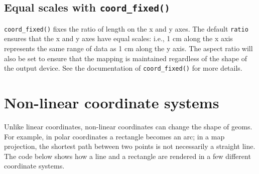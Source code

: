 \subsection{\texorpdfstring{Equal scales with
\texttt{coord\_fixed()}}{Equal scales with coord\_fixed()}}\label{equal-scales-with-coordux5ffixed}

\texttt{coord\_fixed()} fixes the ratio of length on the x and y axes.
The default \texttt{ratio} ensures that the x and y axes have equal
scales: i.e., 1 cm along the x axis represents the same range of data as
1 cm along the y axis. The aspect ratio will also be set to ensure that
the mapping is maintained regardless of the shape of the output device.
See the documentation of \texttt{coord\_fixed()} for more details.
 

\section{Non-linear coordinate systems}\label{sub:coord-non-linear}

Unlike linear coordinates, non-linear coordinates can change the shape
of geoms. For example, in polar coordinates a rectangle becomes an arc;
in a map projection, the shortest path between two points is not
necessarily a straight line. The code below shows how a line and a
rectangle are rendered in a few different coordinate systems.

\begin{Shaded}
\begin{Highlighting}[]
\StringTok{ }\NormalTok{(} \NormalTok{, } \NormalTok{)}
\StringTok{ }\NormalTok{(} \NormalTok{(}\NormalTok{, }\NormalTok{), } \NormalTok{(}\NormalTok{, }\NormalTok{))}
\StringTok{ }\NormalTok{(} \StringTok{ }
\StringTok{  }\NormalTok{(} \NormalTok{(} \NormalTok{, } \NormalTok{)) +}\StringTok{ }
\StringTok{  }\NormalTok{(} \StringTok{ }
\StringTok{  }\NormalTok{(}\NormalTok{) +}\StringTok{ }\NormalTok{(}\NormalTok{)}
\StringTok{ }\NormalTok{(}\NormalTok{)}
\StringTok{ }\NormalTok{(}\NormalTok{)}
\end{Highlighting}
\end{Shaded}

